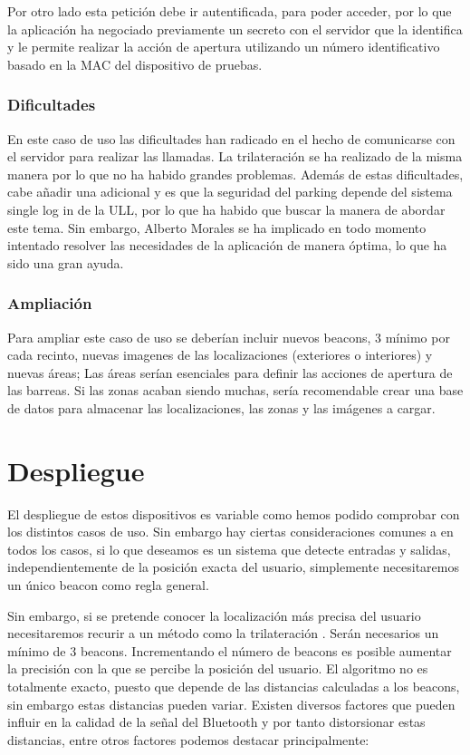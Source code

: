 Por otro lado esta petición debe ir autentificada, para poder acceder, por lo que la aplicación ha negociado previamente un secreto con el servidor que la identifica y le permite realizar la acción de apertura utilizando un número identificativo basado en la MAC del dispositivo de pruebas.


\subsubsection{Dificultades}

En este caso de uso las dificultades han radicado en el hecho de comunicarse con el servidor para realizar las llamadas. La trilateración se ha realizado de la misma manera por lo que no ha habido grandes problemas. Además de estas dificultades, cabe añadir una adicional y es que la seguridad del parking depende del sistema single log in de la ULL, por lo que ha habido que buscar la manera de abordar este tema. Sin embargo, Alberto Morales se ha implicado en todo momento intentado resolver las necesidades de la aplicación de manera óptima, lo que ha sido una gran ayuda.

\subsubsection{Ampliación}

Para ampliar este caso de uso se deberían incluir nuevos beacons, 3 mínimo por cada recinto, nuevas imagenes de las localizaciones (exteriores o interiores) y nuevas áreas; Las áreas serían esenciales para definir las acciones de apertura de las barreas. Si las zonas acaban siendo muchas, sería recomendable crear una base de datos  para almacenar las localizaciones, las zonas y las imágenes a cargar.

\section{Despliegue}

El despliegue de estos dispositivos es variable como hemos podido comprobar con los distintos casos de uso. Sin embargo hay ciertas consideraciones comunes a en todos los casos, si lo que deseamos es un sistema que detecte entradas y salidas, independientemente de la posición exacta del usuario, simplemente necesitaremos un único beacon como regla general. 


Sin embargo, si se pretende conocer la localización más precisa del usuario necesitaremos recurir a un método como la trilateración \cite{URL::trilateracion}. Serán necesarios un mínimo de 3 beacons. Incrementando el número de beacons es posible aumentar la precisión con la que se percibe la posición del usuario. El algoritmo no es totalmente exacto, puesto que depende de las distancias calculadas a los beacons, sin embargo estas distancias pueden variar. Existen diversos factores que pueden influir en la calidad de la señal del Bluetooth y por tanto distorsionar estas distancias, entre otros factores podemos destacar principalmente:


